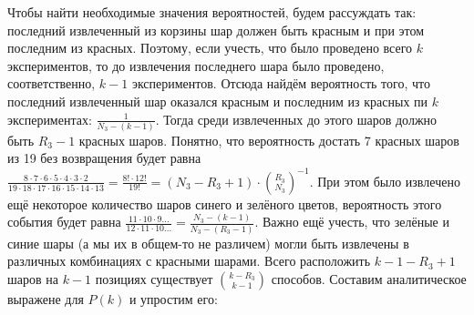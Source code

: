 \documentclass{article}
\begin{document}
Чтобы найти необходимые значения вероятностей, будем рассуждать так: последний извлеченный из корзины шар должен быть красным и при этом последним из красных. Поэтому, если учесть, что было проведено всего \begin{math}k\end{math} экспериментов, то до извлечения последнего шара было проведено, соответственно, \begin{math}k-1\end{math} экспериментов. Отсюда найдём вероятность того, что последний извлеченный шар оказался красным и последним из красных пи \begin{math}k\end{math} экспериментах: \begin{math} \displaystyle\frac{1}{N_3 - (k - 1)}\end{math}. Тогда среди извлеченных до этого шаров должно быть \begin{math}R_3 - 1\end{math} красных шаров. Понятно, что вероятность достать 7 красных шаров из 19 без возвращения будет равна \begin{math}\displaystyle\frac{8 \cdot 7 \cdot 6 \cdot 5 \cdot 4 \cdot 3 \cdot 2}{19 \cdot 18 \cdot 17 \cdot 16 \cdot 15 \cdot 14 \cdot 13} = \displaystyle\frac{8! \cdot 12!}{19!} = \left(N_3 - R_3 + 1 \right) \cdot \displaystyle{R_3 \choose N_3}^{-1} \end{math}. При этом было извлечено ещё некоторое количество шаров синего и зелёного цветов, вероятность этого события будет равна \begin{math}\displaystyle\frac{11 \cdot 10 \cdot 9 ...}{12 \cdot 11 \cdot 10 ...} = \displaystyle\frac{N_3 - (k - 1)}{N_3 - (R_3 - 1)}\end{math}. Важно ещё учесть, что зелёные и синие шары (а мы их в общем-то не различем) могли быть извлечены в различных комбинациях с красными шарами. Всего расположить \begin{math}k-  1 - R_3+1 \end{math} шаров на  \begin{math}k- 1 \end{math} позициях существует \begin{math}\displaystyle{k - R_3 \choose k - 1} \end{math} способов. Составим аналитическое выражене для \begin{math}P(k)\end{math} и упростим его:
\vspace{\baselineskip}
\end{document}
